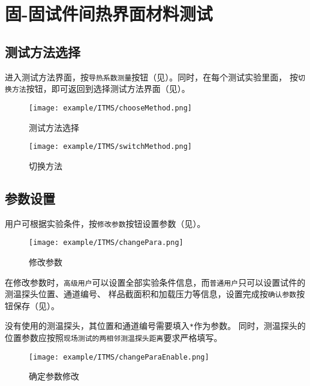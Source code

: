 \section{固-固试件间热界面材料测试}
\subsection{测试方法选择}
进入测试方法界面，按\lstinline{导热系数测量}按钮（见）。同时，在每个测试实验里面，
按\lstinline{切换方法}按钮，即可返回到选择测试方法界面（见）。
\begin{figure}[htbp]
	\centering
	\texttt{[image: example/ITMS/chooseMethod.png]}
	\caption{ 测试方法选择 \label{fig:exmp_itms_chooseMethod}}
\end{figure}

\begin{figure}[htbp]
	\centering
	\texttt{[image: example/ITMS/switchMethod.png]}
	\caption{ 切换方法 \label{fig:exmp_itms_switchMethod}}
\end{figure}

\subsection{参数设置}
用户可根据实验条件，按\lstinline{修改参数}按钮设置参数（见）。
\begin{figure}[htbp]
	\centering
	\texttt{[image: example/ITMS/changePara.png]}
	\caption{ 修改参数 \label{fig:exmp_itms_changePara}}
\end{figure}
在修改参数时，\lstinline{高级用户}可以设置全部实验条件信息，而\lstinline{普通用户}只可以设置试件的测温探头位置、通道编号、
样品截面积和加载压力等信息，设置完成按\lstinline{确认参数}按钮保存（见）。
\begin{note}
没有使用的测温探头，其位置和通道编号需要填入\lstinline{*}作为参数。
同时，测温探头的位置参数应按照\lstinline{现场测试的两相邻测温探头距离}要求严格填写。
\end{note}
\begin{figure}[htbp]
	\centering
	\texttt{[image: example/ITMS/changeParaEnable.png]}
	\caption{ 确定参数修改 \label{fig:exmp_itms_changeParaEnable}}
\end{figure}
~\\
